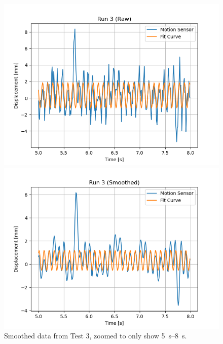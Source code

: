 \documentclass[12 pt]{report}
\begin{document}
\begin{figure}[htbp]
    \centering
    \begin{minipage}{0.45\textwidth}
        \centering
        \includegraphics[width=1.0\textwidth]{images/Graphs/Run_3-Raw-Zoomed} %
        \caption{Raw data from Test \num{3}, zoomed to only show \qtyrange{5}{8}{\s}.}
        \label{fig:run_3-raw-zoomed}
    \end{minipage}\hfill
    \begin{minipage}{0.45\textwidth}
        \centering
        \includegraphics[width=1.0\textwidth]{images/Graphs/Run_3-Smoothed-Zoomed} %
        \caption{Smoothed data from Test \num{3}, zoomed to only show \qtyrange{5}{8}{\s}.}
        \label{fig:run_3-smoothed-zoomed}
    \end{minipage}
\end{figure}
\end{document}
